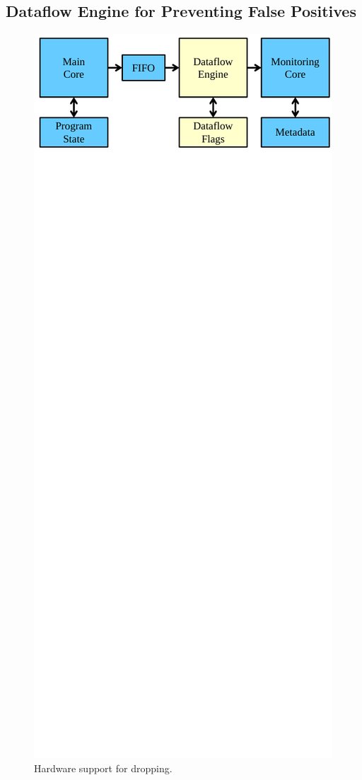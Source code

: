 \subsection{Dataflow Engine for Preventing False Positives}
\label{sec:dropping.arch}

\begin{figure}
  \begin{center}
    \includegraphics[width=\columnwidth]{figs/dataflow_overview.pdf}
    \caption{Hardware support for dropping.}
    \label{fig:dropping.dataflow_overview}
    \vspace{-0.1in}
  \end{center}
\end{figure}

